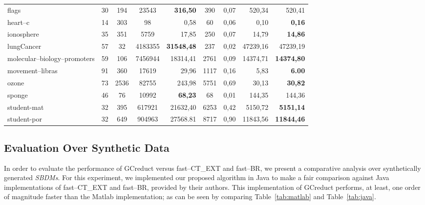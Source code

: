 \documentclass[authoryear,preprint,review,12pt]{elsarticle}
\begin{document}
\begin{table}[!htb]
\begin{tabular}{|l|c|c|c|r|c|c|r|r|}
			flags & 30 & 194 & 23543 & \textbf{316,50} & 390 & 0,07 & 520,34 & 520,41 \\ %
			heart--c & 14 & 303 & 98 & 0,58 & 60 & 0,06 & 0,10 & \textbf{0,16}\\ %
			ionosphere & 35 & 351 & 5759 & 17,85 & 250 & 0,07 & 14,79 & \textbf{14,86}\\ %
			lungCancer & 57 & 32 & 4183355 & \textbf{31548,48} & 237 & 0,02 & 47239,16 & 47239,19 \\ %
			molecular--biology--promoters & 59 & 106 & 7456944 & 18314,41 & 2761 & 0,09 & 14374,71 & \textbf{14374,80} \\ %
			movement--libras & 91 & 360 & 17619 & 29,96 & 1117 & 0,16 & 5,83 & \textbf{6.00} \\ %
			ozone & 73 & 2536 & 82755 & 243,98 & 5751 & 0,69 & 30,13 & \textbf{30,82} \\ %
			sponge & 46 & 76 & 10992 & \textbf{68,23} & 68 & 0,01 & 144,35 & 144,36 \\ %
			student-mat & 32 & 395 & 617921 & 21632,40 & 6253 & 0,42 & 5150,72 & \textbf{5151,14}\\
			student-por & 32 & 649 & 904963 & 27568.81 & 8717 & 0,90 & 11843,56 & \textbf{11844,46} \\
    		\hline
    	\end{tabular}
    \end{table}
    

\subsection{Evaluation Over Synthetic Data}\label{sub:synth}
	In order to evaluate the performance of GCreduct versus fast--CT\_EXT and fast--BR, we present a comparative analysis over synthetically generated \textit{SBDMs}. For this experiment, we implemented our proposed algorithm in Java to make a fair comparison against Java implementations of fast--CT\_EXT and fast--BR, provided by their authors. This implementation of GCreduct performs, at least, one order of magnitude faster than the Matlab implementation; as can be seen by comparing Table~\ref{tab:matlab} and Table~\ref{tab:java}.
	
\end{document}
